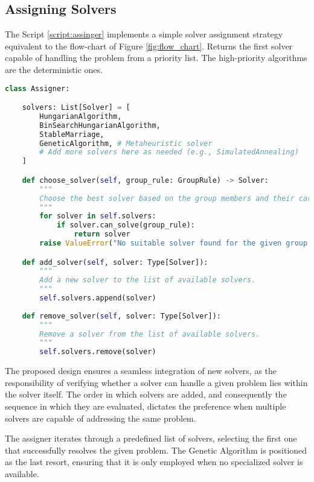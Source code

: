         \subsection{Assigning Solvers}
            The Script \ref{script:assinger} implements a simple solver assignment strategy equivalent to the flow-chart of Figure \ref{fig:flow_chart}.
            Returns the first solver capable of handling the problem from a priority list.
            The high-priority algorithms are the deterministic ones.
            
    \begin{lstlisting}[language=Python, caption={Assigner Class.}, label={script:assinger}]
class Assigner:

    solvers: List[Solver] = [
        HungarianAlgorithm,
        BinSearchHungarianAlgorithm,
        StableMarriage,
        GeneticAlgorithm, # Metaheuristic solver
        # Add more solvers here as needed (e.g., SimulatedAnnealing)
    ]

    def choose_solver(self, group_rule: GroupRule) -> Solver:
        """
        Choose the best solver based on the group members and their cardinality.
        """
        for solver in self.solvers:
            if solver.can_solve(group_rule):
                return solver
        raise ValueError("No suitable solver found for the given group.")

    def add_solver(self, solver: Type[Solver]):
        """
        Add a new solver to the list of available solvers.
        """
        self.solvers.append(solver)
    
    def remove_solver(self, solver: Type[Solver]):
        """
        Remove a solver from the list of available solvers.
        """
        self.solvers.remove(solver)
\end{lstlisting}

            The proposed design ensures a seamless integration of new solvers, as the responsibility of verifying whether a solver can handle a given problem lies within the solver itself. The order in which solvers are added, and consequently the sequence in which they are evaluated, dictates the preference when multiple solvers are capable of addressing the same problem.

            The assigner iterates through a predefined list of solvers, selecting the first one that successfully resolves the given problem. The Genetic Algorithm is positioned as the last resort, ensuring that it is only employed when no specialized solver is available.

